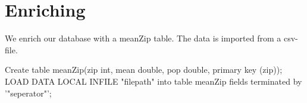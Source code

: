 \section{Enriching}
We enrich our database with a meanZip table. The data is imported from a
csv-file.\\
\begin{spverbatim}
Create table meanZip(zip int, mean double, pop double, primary key (zip));
LOAD DATA LOCAL INFILE "filepath" into table meanZip fields terminated by '"seperator"'; 
\end{spverbatim}
\newpage
